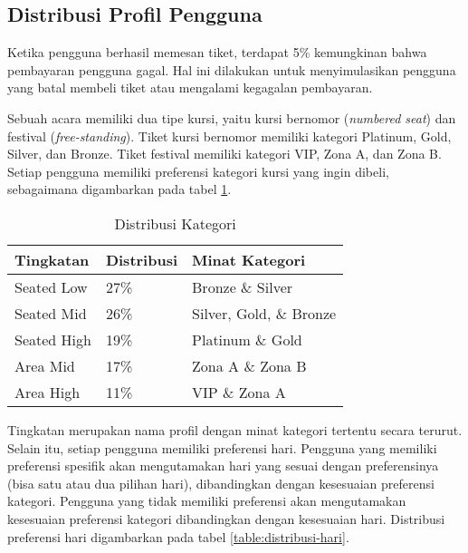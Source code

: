 \subsection{Distribusi Profil Pengguna}

Ketika pengguna berhasil memesan tiket, terdapat 5\% kemungkinan bahwa pembayaran pengguna gagal. Hal ini dilakukan untuk menyimulasikan pengguna yang batal membeli tiket atau mengalami kegagalan pembayaran.

Sebuah acara memiliki dua tipe kursi, yaitu kursi bernomor (\textit{numbered seat}) dan festival (\textit{free-standing}). Tiket kursi bernomor memiliki kategori Platinum, Gold, Silver, dan Bronze. Tiket festival memiliki kategori VIP, Zona A, dan Zona B. Setiap pengguna memiliki preferensi kategori kursi yang ingin dibeli, sebagaimana digambarkan pada tabel \ref{table:distribusi-kategori}.

\begin{table}[h]
    \centering
    \caption{Distribusi Kategori}
    \label{table:distribusi-kategori}
    \begin{tabular}{|l|l|l|}
        \hline
        \textbf{Tingkatan} & \textbf{Distribusi} & \textbf{Minat Kategori} \\
        \hline
        Seated Low         & 27\%                & Bronze \& Silver        \\
        \hline
        Seated Mid         & 26\%                & Silver, Gold, \& Bronze \\
        \hline
        Seated High        & 19\%                & Platinum \& Gold        \\
        \hline
        Area Mid           & 17\%                & Zona A \& Zona B        \\
        \hline
        Area High          & 11\%                & VIP \& Zona A           \\
        \hline
    \end{tabular}
\end{table}

Tingkatan merupakan nama profil dengan minat kategori tertentu secara terurut. Selain itu, setiap pengguna memiliki preferensi hari. Pengguna yang memiliki preferensi spesifik akan mengutamakan hari yang sesuai dengan preferensinya (bisa satu atau dua pilihan hari), dibandingkan dengan kesesuaian preferensi kategori. Pengguna yang tidak memiliki preferensi akan mengutamakan kesesuaian preferensi kategori dibandingkan dengan kesesuaian hari. Distribusi preferensi hari digambarkan pada tabel \ref{table:distribusi-hari}.

